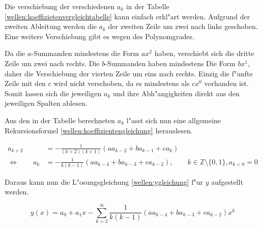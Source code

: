 Die verschiebung der verschiedenen $a_k$ in der Tabelle 
\ref{wellen:koeffizietenvergleichtabelle} kann einfach erkl"art werden. 
Aufgrund der zweiten Ableitung werden die $a_k$ der zweiten Zeile um zwei nach 
links geschoben. Eine weitere Verschiebung gibt es wegen des Polynomgrades.

Da die $a$-Summanden mindestens die Form $ax^2$ haben, verschiebt sich die 
dritte Zeile um zwei nach rechts. Die $b$-Summanden haben mindestens Die Form 
$bx^1$, daher die Verschiebung der vierten Zeile um eins nach rechts. Einzig 
die f"unfte Zeile mit den $c$ wird nicht verschoben, da es mindestens als 
$cx^0$ vorhanden ist. Somit lassen sich die jeweiligen $a_k$ und ihre 
Abh"angigkeiten direkt aus den jeweiligen Spalten ablesen.

Aus den in der Tabelle berechneten $a_k$ l"asst sich nun eine allgemeine 
Rekursionsformel \ref{wellen:koeffizientengleichung} herauslesen. 

\begin{equation}
	\begin{split}
		a_{k+2} &= -\frac{1}{(k+2)(k+1)} (aa_{k-2}+ba_{k-1}+ca_k) \\
		\Leftrightarrow \qquad
		a_k &= -\frac{1}{k(k-1)} (aa_{k-4}+ba_{k-3}+ca_{k-2}), \qquad k \in 
		\mathbb{Z} \setminus \{0, 1\}, a_{k<0} = 0
	\end{split}
	\label{wellen:koeffizientengleichung}
\end{equation}

Daraus kann nun die L"osungsgleichung \ref{wellen:ygleichung} f"ur $y$ 
aufgestellt werden.

\begin{equation}
	y(x) = a_0 + a_1x 
	-\sum_{k=2}^{\infty}\frac{1}{k(k-1)}(aa_{k-4}+ba_{k-3}+ca_{k-2})x^k
	\label{wellen:ygleichung}
\end{equation}
